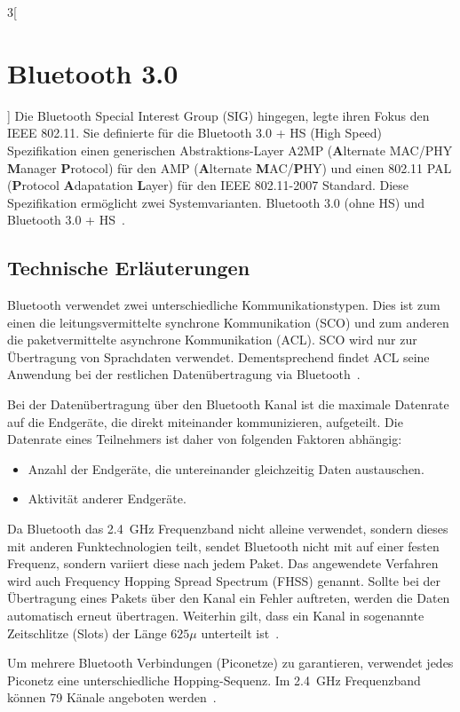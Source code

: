 \begin{multicols}{3}[\section{Bluetooth 3.0}]
Die Bluetooth Special Interest Group (SIG) hingegen, legte ihren Fokus den IEEE 802.11. Sie definierte für die Bluetooth 3.0 + HS (High Speed) Spezifikation einen generischen Abstraktions-Layer A2MP (\textbf{A}lternate MAC/PHY \textbf{M}anager \textbf{P}rotocol) für den AMP (\textbf{A}lternate \textbf{M}AC/\textbf{P}HY) und einen 802.11 PAL (\textbf{P}rotocol \textbf{A}dapatation \textbf{L}ayer) für den IEEE 802.11-2007 Standard. Diese Spezifikation ermöglicht zwei Systemvarianten. Bluetooth 3.0 (ohne HS) und Bluetooth 3.0 + HS~\cite{bluetooth3.0.2}.   

\subsection*{Technische Erläuterungen}
Bluetooth verwendet zwei unterschiedliche Kommunikationstypen. Dies ist zum einen die leitungsvermittelte synchrone Kommunikation (SCO) und zum anderen die paketvermittelte asynchrone Kommunikation (ACL). SCO wird nur zur Übertragung von Sprachdaten verwendet. Dementsprechend findet ACL seine Anwendung bei der restlichen Datenübertragung via Bluetooth~\cite{bluetooth3.0.4}.

Bei der Datenübertragung über den Bluetooth Kanal ist die maximale Datenrate auf die Endgeräte, die direkt miteinander kommunizieren, aufgeteilt. Die Datenrate eines Teilnehmers ist daher von folgenden Faktoren abhängig:
\begin{itemize}
	\item Anzahl der Endgeräte, die untereinander gleichzeitig Daten austauschen.
	\item Aktivität anderer Endgeräte.
\end{itemize}
Da Bluetooth das \SI{2,4}{\giga\hertz} Frequenzband nicht alleine verwendet, sondern dieses mit anderen Funktechnologien teilt, sendet Bluetooth nicht mit auf einer festen Frequenz, sondern variiert diese nach jedem Paket. Das angewendete Verfahren wird auch Frequency Hopping Spread Spectrum (FHSS) genannt. Sollte bei der Übertragung eines Pakets über den Kanal ein Fehler auftreten, werden die Daten automatisch erneut übertragen. Weiterhin gilt, dass ein Kanal in sogenannte Zeitschlitze (Slots) der Länge $625\mu$ unterteilt ist~\cite{bluetooth3.0.1}.

Um mehrere Bluetooth Verbindungen (Piconetze) zu garantieren, verwendet jedes Piconetz eine unterschiedliche Hopping-Sequenz. Im \SI{2,4}{\giga\hertz} Frequenzband können 79 Känale angeboten werden~\cite{bluetooth3.0.3}.


\end{multicols}
